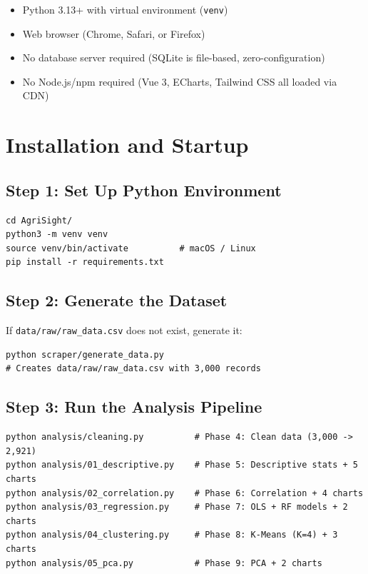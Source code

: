 \documentclass[12pt,a4paper]{report}
\begin{document}
\begin{itemize}[itemsep=2pt]
  \item Python 3.13+ with virtual environment (\texttt{venv})
  \item Web browser (Chrome, Safari, or Firefox)
  \item No database server required (SQLite is file-based, zero-configuration)
  \item No Node.js/npm required (Vue 3, ECharts, Tailwind CSS all loaded via CDN)
\end{itemize}

\section{Installation and Startup}

\subsection{Step 1: Set Up Python Environment}

\begin{lstlisting}[caption={Environment setup}]
cd AgriSight/
python3 -m venv venv
source venv/bin/activate          # macOS / Linux
pip install -r requirements.txt
\end{lstlisting}

\subsection{Step 2: Generate the Dataset}

If \texttt{data/raw/raw\_data.csv} does not exist, generate it:

\begin{lstlisting}[caption={Dataset generation}]
python scraper/generate_data.py
# Creates data/raw/raw_data.csv with 3,000 records
\end{lstlisting}

\subsection{Step 3: Run the Analysis Pipeline}

\begin{lstlisting}[caption={Full analysis pipeline (Phases 4--9)}]
python analysis/cleaning.py          # Phase 4: Clean data (3,000 -> 2,921)
python analysis/01_descriptive.py    # Phase 5: Descriptive stats + 5 charts
python analysis/02_correlation.py    # Phase 6: Correlation + 4 charts
python analysis/03_regression.py     # Phase 7: OLS + RF models + 2 charts
python analysis/04_clustering.py     # Phase 8: K-Means (K=4) + 3 charts
python analysis/05_pca.py            # Phase 9: PCA + 2 charts
\end{lstlisting}
\end{document}
